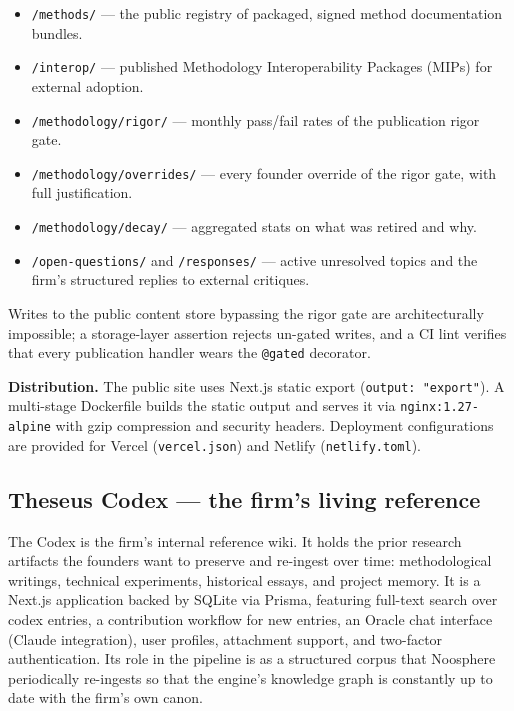 \documentclass[11pt,letterpaper]{article}
\newcommand{\file}[1]{\texttt{#1}}
\begin{document}
\begin{itemize}[leftmargin=1.5em,itemsep=0.1em]
  \item \file{/methods/} --- the public registry of packaged, signed method documentation bundles.
  \item \file{/interop/} --- published Methodology Interoperability Packages (MIPs) for external adoption.
  \item \file{/methodology/rigor/} --- monthly pass/fail rates of the publication rigor gate.
  \item \file{/methodology/overrides/} --- every founder override of the rigor gate, with full justification.
  \item \file{/methodology/decay/} --- aggregated stats on what was retired and why.
  \item \file{/open-questions/} and \file{/responses/} --- active unresolved topics and the firm's structured replies to external critiques.
\end{itemize}

Writes to the public content store bypassing the rigor gate are architecturally impossible; a storage-layer assertion rejects un-gated writes, and a CI lint verifies that every publication handler wears the \texttt{@gated} decorator.

\textbf{Distribution.} The public site uses Next.js static export (\texttt{output: "export"}). A multi-stage Dockerfile builds the static output and serves it via \texttt{nginx:1.27-alpine} with gzip compression and security headers. Deployment configurations are provided for Vercel (\file{vercel.json}) and Netlify (\file{netlify.toml}).

\subsection{Theseus Codex --- the firm's living reference}

The Codex is the firm's internal reference wiki. It holds the prior research artifacts the founders want to preserve and re-ingest over time: methodological writings, technical experiments, historical essays, and project memory. It is a Next.js application backed by SQLite via Prisma, featuring full-text search over codex entries, a contribution workflow for new entries, an Oracle chat interface (Claude integration), user profiles, attachment support, and two-factor authentication. Its role in the pipeline is as a structured corpus that Noosphere periodically re-ingests so that the engine's knowledge graph is constantly up to date with the firm's own canon.
\end{document}

